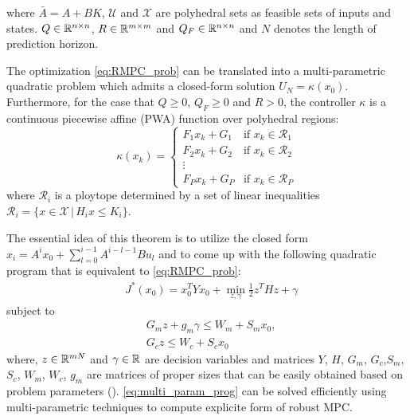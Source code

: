where $\bar A=A+BK$, $\mathcal U$ and $\mathcal X$ are polyhedral sets as feasible sets of inputs and states. $Q\in\mathbb{R}^{n\times n}$, $R\in\mathbb{R}^{m\times m}$ and $Q_F\in\mathbb{R}^{n\times n}$ and $N$ denotes the length of prediction horizon.
\begin{theorem}
The optimization  \eqref{eq:RMPC_prob} can be translated into a multi-parametric quadratic problem which admits a closed-form solution $U_N=\kappa(x_0)$. Furthermore, for the case that $Q\geq0$, $Q_F\geq0$ and $R>0$, the controller $\kappa$ is a continuous piecewise affine (PWA) function over polyhedral regions:
\begin{equation}
\kappa(x_k)=
\begin{cases}
F_1x_k+G_1 & \text{if $x_k\in \mathcal{R}_1$}\\
F_2x_k+G_2 & \text{if $x_k\in \mathcal{R}_2$}\\
\vdots\\
F_Px_k+G_P & \text{if $x_k\in \mathcal{R}_P$}
\end{cases} 
\end{equation}
where $\mathcal{R}_i$ is a ploytope determined by a set of linear inequalities $\mathcal R_i = \{x\in\mathcal X\,|\,H_ix\leq K_i\}$. 
\end{theorem}
The essential idea of this theorem is to utilize the closed form $x_i=A^ix_0+\sum_{l=0}^{i-1}A^{i-l-1}Bu_l$ and to come up with the following quadratic program that is equivalent to \eqref{eq:RMPC_prob}:
\begin{align*}
\label{eq:multi_param_prog}
&J^{\ast}(x_0)=x_0^TYx_0+\min_{z,\gamma}\frac{1}{2}z^THz+\gamma
\end{align*}
subject to
\begin{align}
&G_mz+g_m\gamma\leq W_m+S_mx_0,\nonumber\\
&G_cz\leq W_c+S_cx_0
\end{align} 
where, $z\in \mathbb{R}^{mN}$ and $\gamma\in\mathbb{R}$ are decision variables and matrices $Y$, $H$, $G_m$, $G_c$,$S_m$, $S_c$, $W_m$, $W_c$, $g_m$ are matrices of proper sizes that can be easily obtained based on problem parameters (\cite{delaPea:2005}). \eqref{eq:multi_param_prog} can be solved efficiently using multi-parametric techniques to compute explicite form of robust MPC.

